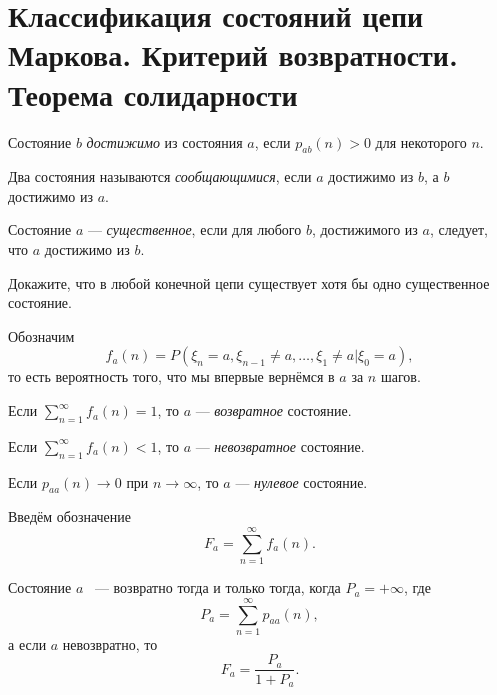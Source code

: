 \section{Классификация состояний цепи Маркова. Критерий возвратности. Теорема солидарности}

\begin{definition}
    Состояние $b$ \textit{достижимо} из состояния $a$, если $p_{ab}(n) > 0 $ для некоторого $n$.

    Два состояния называются \textit{сообщающимися}, если $a$ достижимо из $b$, а $b$ достижимо из $a$.

    Состояние $a$ --- \textit{существенное}, если для любого $b$, достижимого из $a$, следует, что $a$ достижимо из $b$.
\end{definition}

\begin{exercise}
    Докажите, что в любой конечной цепи существует хотя бы одно существенное состояние.
\end{exercise}

Обозначим 
$$f_a(n)= P(\xi_n = a, \xi_{n - 1}\neq a, \ldots, \xi_1\neq a| \xi_0 = a),$$ то есть вероятность того, что мы впервые вернёмся в $a$ за $n$ шагов.

\begin{definition}
    Если $\sum_{n = 1}^{\infty}f_a(n) = 1$, то $a$ --- \textit{возвратное} состояние.

    Если $\sum_{n = 1}^{\infty}f_a(n) < 1$, то $a$ --- \textit{невозвратное} состояние.
\end{definition}

\begin{definition}
    Если $p_{aa}(n) \to 0$ при $n \to \infty$, то $a$ --- \textit{нулевое} состояние.
\end{definition}

Введём обозначение
    $$F_a = \sum \limits_{n = 1}^{\infty}f_a(n).$$


\begin{theorem}
    Состояние $a$ ~--- возвратно тогда и только тогда, когда $P_a = +\infty$, где 
    $$P_a = \sum \limits_{n = 1}^{\infty}p_{aa}(n),$$ а если $a$ невозвратно, то 
    $$F_a = \frac{P_a}{1+P_a}.$$
\end{theorem}

